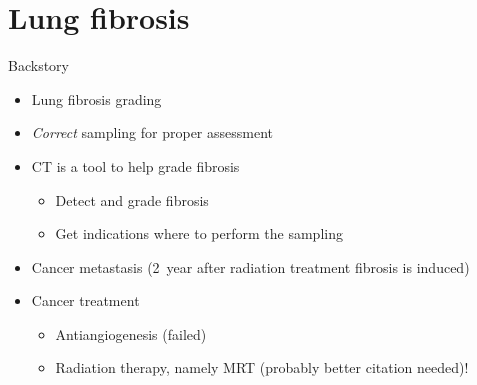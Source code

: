 \documentclass[caption=numbered]{beamer}
\newcommand{\uct}{\si{\micro}CT\xspace}
\begin{document}
\section{Lung fibrosis}
\begin{frame}{Backstory}
	\begin{itemize}
		\item Lung fibrosis grading \cite{Ashcroft1988a}
		\item \emph{Correct} sampling for proper assessment
		\item \uct is a tool to help grade fibrosis
		\begin{itemize}
			\item Detect and grade fibrosis
			\item Get indications where to perform the sampling
		\end{itemize}
		\item Cancer metastasis (\SI{2}{year} after radiation treatment fibrosis is induced)
		\item Cancer treatment
		\begin{itemize}
			\item Antiangiogenesis (failed)
			\item Radiation therapy, namely MRT \cite{Bronnimann2016} (probably better citation needed)!
		\end{itemize}
	\end{itemize}
\end{frame}
\end{document}

